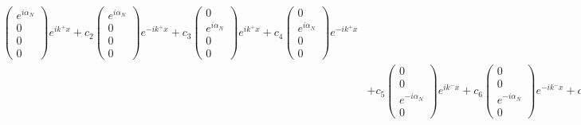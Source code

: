 \begin{equation}
\begin{split}
\begin{pmatrix}
e^{i\alpha_N} \\ 0 \\ 0 \\ 0
\end{pmatrix}e^{ik^+x}
+
c_2
\begin{pmatrix}
e^{i\alpha_N} \\ 0 \\ 0 \\ 0
\end{pmatrix}e^{-ik^+x}
+
c_3
\begin{pmatrix}
0 \\ e^{i\alpha_N} \\ 0 \\ 0
\end{pmatrix}e^{ik^+x}
+
c_4
\begin{pmatrix}
0 \\ e^{i\alpha_N} \\ 0 \\ 0
\end{pmatrix}e^{-ik^+x}
\\&+
c_5
\begin{pmatrix}
0 \\ 0 \\ e^{-i\alpha_N} \\ 0
\end{pmatrix}e^{ik^-x}
+
c_6
\begin{pmatrix}
0 \\ 0 \\ e^{-i\alpha_N} \\ 0
\end{pmatrix}e^{-ik^-x}
+
c_7
\begin{pmatrix}
0 \\ 0 \\ 0 \\ e^{-i\alpha_N}
\end{pmatrix}e^{ik^-x}
+
c_8
\begin{pmatrix}
0 \\ 0 \\ 0 \\ e^{-i\alpha_N}
\end{pmatrix}e^{-ik^-x}
\end{split}
\end{equation}